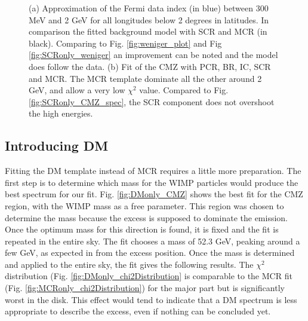 \begin{figure}[h]
  \caption[MCR fit spectra.]{(a) Approximation of the Fermi data index (in blue) between 300 MeV and 2 GeV for all longitudes below 2 degrees in latitudes. In comparison the fitted background model with SCR and MCR (in black). Comparing to Fig. \ref{fig:weniger_plot} and Fig \ref{fig:SCRonly_weniger} an improvement can be noted and the model does follow the data. (b) Fit of the CMZ with PCR, BR, IC, SCR and MCR. The MCR template dominate all the other around 2 GeV, and allow a very low $\chi^2$ value. Compared to Fig. \ref{fig:SCRonly_CMZ_spec}, the SCR component does not overshoot the high energies.}
  \label{fig:MCR_vs_SCRonly_CMZ}
\end{figure}

\newpage
\subsection{Introducing DM}
%

%
%

Fitting the DM template instead of MCR requires a little more preparation. The first step is to determine which mass for the WIMP particles would produce the best spectrum for our fit. Fig. \ref{fig:DMonly_CMZ} shows the best fit for the CMZ region, with the WIMP mass as a free parameter. This region was chosen to determine the mass because the excess is supposed to dominate the emission. Once the optimum mass for this direction is found, it is fixed and the fit is repeated in the entire sky.
The fit chooses a mass of 52.3 GeV, peaking around a few GeV, as expected in from the excess position.
Once the mass is determined and applied to the entire sky, the fit gives the following results. The $\chi^2$ distribution (Fig. \ref{fig:DMonly_chi2Distribution} is comparable to the MCR fit (Fig. \ref{fig:MCRonly_chi2Distribution}) for the major part but is significantly worst in the disk. This effect would tend to indicate that a DM spectrum is less appropriate to describe the excess, even if nothing can be concluded yet.

